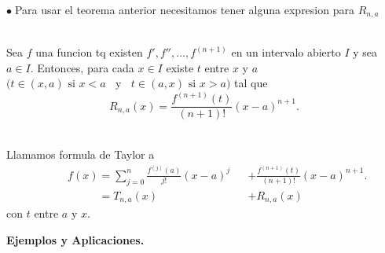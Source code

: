 \documentclass{article}
\theoremstyle{definition}
\theoremstyle{definition}
\theoremstyle{remark}
\newcommand\bl{$\bullet\;$}
\begin{document}
\bl Para usar el teorema anterior necesitamos tener alguna expresion para $R_{n,a}$
\begin{teo} \; \\
  Sea $f$ una funcion tq existen $f', f'', \dots, f^{(n+1)}$ en un intervalo abierto $I$ y sea $a \in I$. Entonces, para cada $x \in I$ existe $t$ entre $x$ y $a$ $\big(t \in (x,a) \text{ si }x<a \;\; \text{ y } \;\; t \in (a,x) \text{ si } x>a\big)$ tal que \[ 
    R_{n,a}(x)=\frac{f^{(n+1)}(t)}{(n+1)!}(x-a)^{n+1}.
  \]
\end{teo}

\begin{defi} \; \\
  Llamamos formula de Taylor a  
  \begin{align*}
   &  &&f(x)=\sum_{j=0}^{n}{\frac{f^{(j)}(a)}{j!}(x-a)^j}&&+\frac{f^{(n+1)}(t)}{(n+1)!}(x-a)^{n+1}. \\ 
   &      &&\phantom{f(x)}= T_{n,a}(x) &&+ R_{n,a}(x) 
  \end{align*}
   con $t$ entre $a$ y $x$. 
\end{defi}
\pagebreak
\begin{center}
\textbf{Ejemplos y Aplicaciones.}
\end{center}
\end{document}
